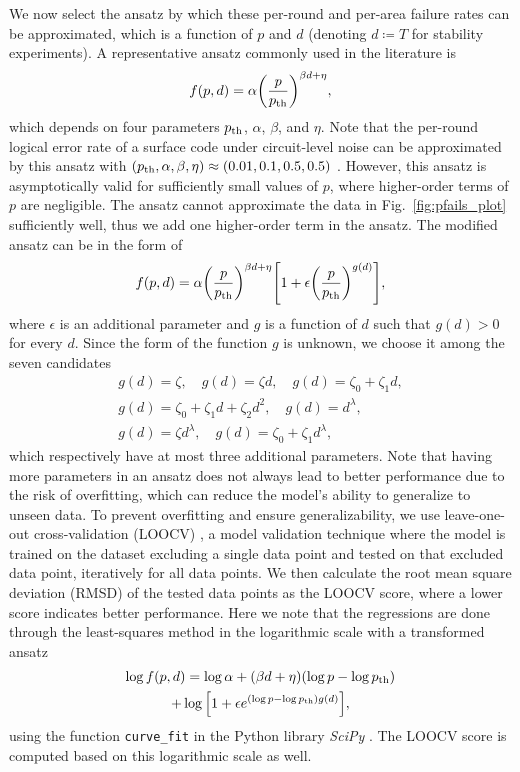 \documentclass[
 prx,
 reprint,
 superscriptaddress,
 longbibliography,
 dvipsnames
]{revtex4-2}
\begin{document}
We now select the ansatz by which these per-round and per-area failure rates can be approximated, which is a function of $p$ and $d$ (denoting $d \coloneqq T$ for stability experiments).
A representative ansatz commonly used in the literature \cite{fowler2019low,litinski2019game,litinski2019magic,lee2025color} is
\begin{align*}
    f(p, d) = \alpha \qty(\frac{p}{p_{\mathrm{th}}})^{\beta d + \eta},
\end{align*}
which depends on four parameters $p_{\mathrm{th}}$, $\alpha$, $\beta$, and $\eta$.
Note that the per-round logical error rate of a surface code under circuit-level noise can be approximated by this ansatz with $(p_{\mathrm{th}}, \alpha, \beta, \eta) \approx (0.01, 0.1, 0.5, 0.5)$ \cite{fowler2019low}.
However, this ansatz is asymptotically valid for sufficiently small values of $p$, where higher-order terms of $p$ are negligible.
The ansatz cannot approximate the data in Fig.~\ref{fig:pfails_plot} sufficiently well, thus we add one higher-order term in the ansatz.
The modified ansatz can be in the form of
\begin{align}
    f(p, d) = \alpha \qty(\frac{p}{p_{\mathrm{th}}})^{\beta d + \eta} \qty[1 + \epsilon \qty(\frac{p}{p_{\mathrm{th}}})^{g(d)}],
    \label{eq:modified_ansatz}
\end{align}
where $\epsilon$ is an additional parameter and $g$ is a function of $d$ such that $g(d) > 0$ for every $d$.
Since the form of the function $g$ is unknown, we choose it among the seven candidates
\begin{gather*}
    g(d) = \zeta, \quad g(d) = \zeta d, \quad g(d) = \zeta_0 + \zeta_1 d, \\
    g(d) = \zeta_0 + \zeta_1 d + \zeta_2 d^2, \quad g(d) = d^\lambda, \\
    g(d) = \zeta d^\lambda, \quad g(d) = \zeta_0 + \zeta_1 d^\lambda,
\end{gather*}
which respectively have at most three additional parameters.
Note that having more parameters in an ansatz does not always lead to better performance due to the risk of overfitting, which can reduce the model's ability to generalize to unseen data.
To prevent overfitting and ensure generalizability, we use leave-one-out cross-validation (LOOCV) \cite{efron1983leisurely}, a model validation technique where the model is trained on the dataset excluding a single data point and tested on that excluded data point, iteratively for all data points. 
We then calculate the root mean square deviation (RMSD) of the tested data points as the LOOCV score, where a lower score indicates better performance.
Here we note that the regressions are done through the least-squares method in the logarithmic scale with a transformed ansatz
\begin{multline*}
    \log f(p, d) = \log\alpha + (\beta d + \eta)(\log p - \log p_{\mathrm{th}}) \\
    + \log\qty[1 + \epsilon e^{(\log p - \log p_{\mathrm{th}})g(d)}],
\end{multline*}
using the function \texttt{curve\_fit} in the Python library \textit{SciPy} \cite{virtanen2020scipy}.
The LOOCV score is computed based on this logarithmic scale as well.
\end{document}
